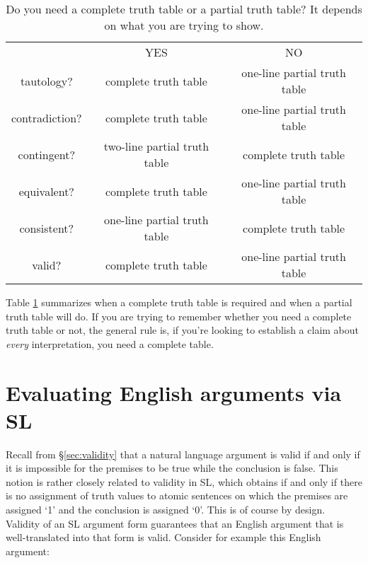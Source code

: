 \begin{table}
\begin{center}
\begin{tabular}{c|c|c|}
\cline{2-3}
 & YES & NO\\
\cline{2-3}
tautology? & complete truth table & one-line partial truth table\\
contradiction? &  complete truth table  & one-line partial truth table\\
contingent? & two-line partial truth table & complete truth table\\
equivalent? & complete truth table & one-line partial truth table\\
consistent? & one-line partial truth table & complete truth table\\
valid? & complete truth table & one-line partial truth table\\
\cline{2-3}
\end{tabular}
\end{center}
\caption{Do you need a complete truth table or a partial truth table? It depends on what you are trying to show.}
\label{table.CompleteVsPartial}
\end{table}

Table \ref{table.CompleteVsPartial} summarizes when a complete truth table is required and when a partial truth table will do. If you are trying to remember whether you need a complete truth table or not, the general rule is, if you're looking to establish a claim about \emph{every} interpretation, you need a complete table.







\section{Evaluating English arguments via SL}
\label{sec:forms}
Recall from \S\ref{sec:validity} that a natural language argument is valid if and only if it is impossible for the premises to be true while the conclusion is false. This notion is rather closely related to validity in SL, which obtains if and only if there is no assignment of truth values to atomic sentences on which the premises are assigned `1' and the conclusion is assigned `0'. This is of course by design. Validity of an SL argument form guarantees that an English argument that is well-translated into that form is valid. Consider for example this English argument:

